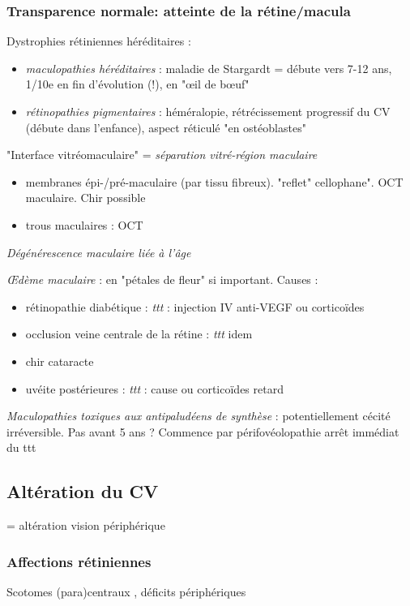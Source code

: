 \documentclass[11pt]{article}
\begin{document}
\subsubsection{Transparence normale: atteinte de la rétine/macula}
\label{sec:org4391062}
Dystrophies rétiniennes héréditaires :
\begin{itemize}
\item \emph{maculopathies héréditaires} : maladie de Stargardt = débute vers 7-12 ans,
1/10e en fin d'évolution (!), en "\oe{}il de b\oe{}uf"
\item \emph{rétinopathies pigmentaires} : héméralopie, rétrécissement progressif du CV
(débute dans l'enfance), aspect réticulé "en ostéoblastes"
\end{itemize}
"Interface vitréomaculaire" = \emph{séparation vitré-région maculaire}
\begin{itemize}
\item membranes épi-/pré-maculaire (par tissu fibreux). "reflet" cellophane". OCT
maculaire. Chir possible
\item trous maculaires : OCT
\end{itemize}
\emph{Dégénérescence maculaire liée à l'âge}

\emph{\OE{}dème maculaire} : en "pétales de fleur" si important. Causes : 
\begin{itemize}
\item rétinopathie diabétique : \emph{ttt} : injection IV anti-VEGF ou corticoïdes
\item occlusion veine centrale de la rétine : \emph{ttt} idem
\item chir cataracte
\item uvéite postérieures : \emph{ttt} : cause ou corticoïdes retard
\end{itemize}

\emph{Maculopathies toxiques aux antipaludéens de synthèse} : potentiellement cécité
irréversible. Pas avant 5 ans ? Commence par périfovéolopathie \thus arrêt
immédiat du ttt \danger

\subsection{Altération du CV}
\label{sec:org81d47b7}
= altération vision périphérique

\subsubsection{Affections rétiniennes}
\label{sec:org1c9dacb}
Scotomes (para)centraux , déficits périphériques
\end{document}
